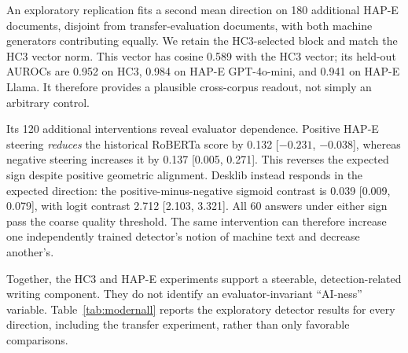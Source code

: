 An exploratory replication fits a second mean direction on 180 additional HAP-E documents, disjoint from transfer-evaluation documents, with both machine generators contributing equally. We retain the HC3-selected block and match the HC3 vector norm. This vector has cosine 0.589 with the HC3 vector; its held-out AUROCs are 0.952 on HC3, 0.984 on HAP-E GPT-4o-mini, and 0.941 on HAP-E Llama. It therefore provides a plausible cross-corpus readout, not simply an arbitrary control.

Its 120 additional interventions reveal evaluator dependence. Positive HAP-E steering \emph{reduces} the historical RoBERTa score by 0.132 [$-0.231$, $-0.038$], whereas negative steering increases it by 0.137 [0.005, 0.271]. This reverses the expected sign despite positive geometric alignment. Desklib instead responds in the expected direction: the positive-minus-negative sigmoid contrast is 0.039 [0.009, 0.079], with logit contrast 2.712 [2.103, 3.321]. All 60 answers under either sign pass the coarse quality threshold. The same intervention can therefore increase one independently trained detector's notion of machine text and decrease another's.

Together, the HC3 and HAP-E experiments support a steerable, detection-related writing component. They do not identify an evaluator-invariant ``AI-ness'' variable. Table~\ref{tab:modernall} reports the exploratory detector results for every direction, including the transfer experiment, rather than only favorable comparisons.
